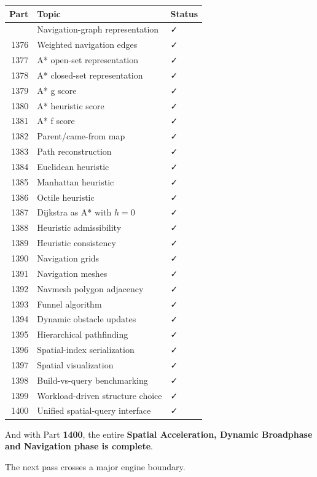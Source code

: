 {\def\LTcaptype{none} %
\begin{longtable}[]{@{}rll@{}}
\toprule\noalign{}
Part & Topic & Status \\
\midrule\noalign{}
\endhead
\bottomrule\noalign{}
\endlastfoot
1375 & Navigation-graph representation & ✓ \\
1376 & Weighted navigation edges & ✓ \\
1377 & A* open-set representation & ✓ \\
1378 & A* closed-set representation & ✓ \\
1379 & A* g score & ✓ \\
1380 & A* heuristic score & ✓ \\
1381 & A* f score & ✓ \\
1382 & Parent/came-from map & ✓ \\
1383 & Path reconstruction & ✓ \\
1384 & Euclidean heuristic & ✓ \\
1385 & Manhattan heuristic & ✓ \\
1386 & Octile heuristic & ✓ \\
1387 & Dijkstra as A* with \(h=0\) & ✓ \\
1388 & Heuristic admissibility & ✓ \\
1389 & Heuristic consistency & ✓ \\
1390 & Navigation grids & ✓ \\
1391 & Navigation meshes & ✓ \\
1392 & Navmesh polygon adjacency & ✓ \\
1393 & Funnel algorithm & ✓ \\
1394 & Dynamic obstacle updates & ✓ \\
1395 & Hierarchical pathfinding & ✓ \\
1396 & Spatial-index serialization & ✓ \\
1397 & Spatial visualization & ✓ \\
1398 & Build-vs-query benchmarking & ✓ \\
1399 & Workload-driven structure choice & ✓ \\
1400 & Unified spatial-query interface & ✓ \\
\end{longtable}
}

And with Part \textbf{1400}, the entire \textbf{Spatial Acceleration, Dynamic Broadphase and Navigation phase is complete}.

The next pass crosses a major engine boundary.

